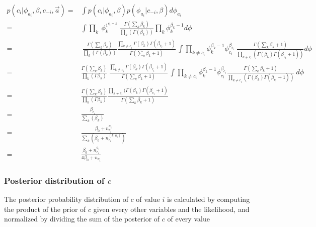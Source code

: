\begin{equation}
\begin{split}
 p(c_{i}|\phi_{a_{i}} ,\beta, c_{-i},  \vec{a})  =& \int p(c_{i}|\phi_{a_{i}}, \beta) p(\phi_{a_{i}}| c_{-i}, \beta)d\phi_{a_{i}} \\
= & \int \prod_{k}\ \phi_{k}^{1^{c_{i}=k}}\ \frac{\Gamma(\sum_{k}\beta_{k})}{\prod_{k}(\Gamma(\beta_{k}))}\prod_{k} \phi_{k}^{\beta_{k}-1}d\phi\\
= & \ \frac{\Gamma(\sum_{k}\beta_{k})}{\prod_{k}(\Gamma(\beta_{k}))} %
\frac{\prod_{k\neq c_{i}}\Gamma(\beta_{k})\Gamma (\beta_{c_{i}}+1)}{\Gamma(\sum_{k}\beta_{k} +1)} \, %
\int \prod_{k\neq c_{i}} \phi_{k}^{\beta_{k}-1} \phi_{c_{i}}^{\beta_{c_{i}}}\ %
\frac{\Gamma(\sum_{k}\beta_{k}+1)}{\prod_{k\neq c_{i}} (\Gamma(\beta_{k}) \Gamma(\beta_{c_{i}}+1))} d\phi\\%
= &  \frac{\Gamma(\sum_{k}\beta_{k})}{\prod_{k}(\Gamma\beta_{k})}\ %
\frac{\prod_{k\neq c_{i}}\Gamma(\beta_{k})\Gamma (\beta_{c_{i}}+1)}{\Gamma(\sum_{k}\beta_{k} +1)} \, %
\int \prod_{k\neq c_{i}} \phi_{k}^{\beta_{k}-1} \phi_{c_{i}}^{\beta_{c_{i}}}%
\frac{\Gamma(\sum_{k}\beta_{k} +1)}{\prod_{k\neq c_{i}} (\Gamma(\beta_{k}) \Gamma(\beta_{c_{i}}+1))} \  %
d\phi\\
=&\frac{\Gamma(\sum_{k}\beta_{k})}{\prod_{k}(\Gamma\beta_{k})}%
\frac{\prod_{k\neq c_{i}} (\Gamma(\beta_{k}) \Gamma(\beta_{c_{i}}+1)}{\Gamma(\sum_{k}\beta_{k}+1)} \\%
= &\frac{\beta_{c_{i}}}{\sum_{k}(\beta_{k})}\\
= & \frac{\beta_{0}+n_{c_{i}}^{a_{i}}}{\sum_{k}(\beta_{0}+n^{(k,a_{i})}_{c_{i}})}\\
= & \frac{\beta_{0}+n_{c_{i}}^{a_{i}}}{4\beta_{0}+n_{a_{i}}}
\end{split}
\end{equation}


\subsubsection{Posterior distribution of $c$}
The posterior probability distribution of $c$ of value $i$ is calculated by computing the product of the prior of $c$ given every other variables and the likelihood, and normalized by dividing the sum of the posterior of $c$ of every value

